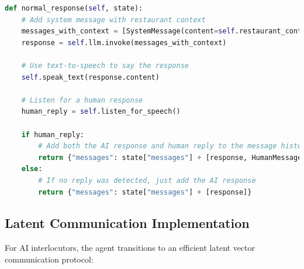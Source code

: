 \documentclass[12pt,openany]{article}
\theoremstyle{definition}
\theoremstyle{definition}
\theoremstyle{definition}
\begin{document}
\begin{lstlisting}[language=Python, caption=Natural Language Communication]
def normal_response(self, state):
    # Add system message with restaurant context
    messages_with_context = [SystemMessage(content=self.restaurant_context)] + state["messages"]
    response = self.llm.invoke(messages_with_context)
    
    # Use text-to-speech to say the response
    self.speak_text(response.content)
    
    # Listen for a human response
    human_reply = self.listen_for_speech()
    
    if human_reply:
        # Add both the AI response and human reply to the message history
        return {"messages": state["messages"] + [response, HumanMessage(content=human_reply)]}
    else:
        # If no reply was detected, just add the AI response
        return {"messages": state["messages"] + [response]}
\end{lstlisting}

\subsection*{Latent Communication Implementation}
For AI interlocutors, the agent transitions to an efficient latent vector communication protocol:
\end{document}

